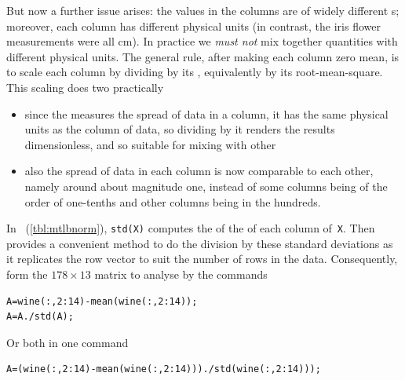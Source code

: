\begin{example}
\begin{solution}
\begin{enumerate}
But now a further issue arises: the values in the columns are of widely different s; moreover, each column has different physical units (in contrast, the iris flower measurements were all cm).
In practice we \emph{must not} mix together quantities with different physical units. 
The general rule, after making each column zero mean, is to scale each column by dividing by its , equivalently by its root-mean-square.
This scaling does two practically 
\begin{itemize}
\item since the  measures the spread of data in a column, it has the same physical units as the column of data, so dividing by it renders the results dimensionless, and so suitable for mixing with other 
\item also the spread of data in each column is now comparable to each other, namely around about magnitude one, instead of some columns being of the order of one-tenths and other columns being in the hundreds.
\end{itemize}
In \script\ (\cref{tbl:mtlbnorm}), \verb|std(X)| computes the  of the  of each column of~\verb|X|.
Then   provides a convenient method to do the division by these standard deviations as it replicates the row vector to suit the number of rows in the data.
Consequently, form the \(178\times13\) matrix to analyse by the commands
\begin{verbatim}
A=wine(:,2:14)-mean(wine(:,2:14));
A=A./std(A);
\end{verbatim}
Or both in one command
\begin{verbatim}
A=(wine(:,2:14)-mean(wine(:,2:14)))./std(wine(:,2:14)));
\end{verbatim}


\end{enumerate}
\end{solution}
\end{example}
